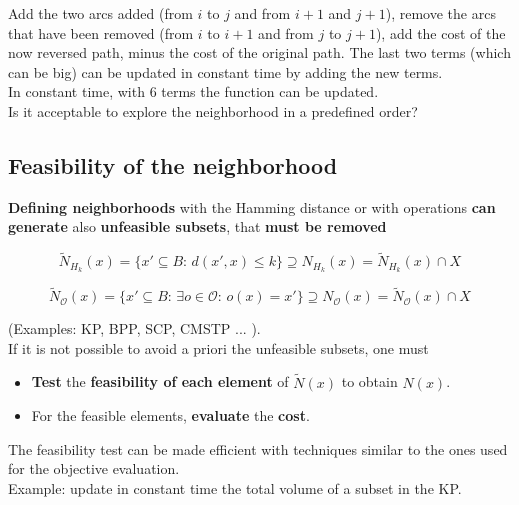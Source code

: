 Add the two arcs added (from $i$ to $j$ and from $i+1$ and $j+1$), remove the arcs that have been removed (from $i$ to $i+1$ and from $j$ to $j+1$), add the cost of the now reversed path, minus the cost of the original path. The last two terms (which can be big) can be updated in constant time by adding the new terms.\\
In constant time, with $6$ terms the function can be updated.\\

Is it acceptable to explore the neighborhood in a predefined order?

\newpage

\subsection{Feasibility of the neighborhood}
\textbf{Defining neighborhoods} with the Hamming distance or with operations \textbf{can generate} also \textbf{unfeasible subsets}, that \textbf{must be removed}

$$ \tilde{N}_{H_k} (x) = \{x' \subseteq B : \, d (x', x) \leq k \} \supseteq N_{H_k} (x) = \tilde{N}_{H_k} (x) \cap X $$

$$ \tilde{N}_{\mathcal{O}} (x) = \{ x' \subseteq B : \, \exists o \in \mathcal{O} : \, o (x) = x' \} \supseteq N_{\mathcal{O}} (x) = \tilde{N}_{\mathcal{O}} (x) \cap X $$

(Examples: KP, BPP, SCP, CMSTP ... ).\\

If it is not possible to avoid a priori the unfeasible subsets, one must
\begin{itemize}
	\item \textbf{Test} the \textbf{feasibility of each element} of $\tilde{N} (x)$ to obtain $N (x)$.\\
	
	\item For the feasible elements, \textbf{evaluate} the \textbf{cost}.\\
\end{itemize}

The feasibility test can be made efficient with techniques similar to the ones used for the objective evaluation.\\

Example: update in constant time the total volume of a subset in the KP.\\

\newpage

